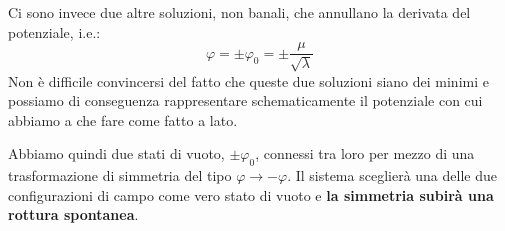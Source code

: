 \documentclass[../main.tex]{subfiles}
\begin{document}
Ci sono invece due altre soluzioni, non banali, che annullano la derivata del potenziale, i.e.:
\[
\varphi = \pm\varphi_0 = \pm\frac{\mu}{\sqrt{\lambda}}
\]
Non è difficile convincersi del fatto che queste due soluzioni siano dei minimi e possiamo di conseguenza rappresentare schematicamente il potenziale con cui abbiamo a che fare come fatto a lato.

Abbiamo quindi due stati di vuoto, $\pm \varphi_0$, connessi tra loro per mezzo di una trasformazione di simmetria del tipo $\varphi\rightarrow -\varphi$. Il sistema sceglierà una delle due configurazioni di campo come vero stato di vuoto e \textbf{la simmetria subirà una rottura spontanea}.
\end{document}
